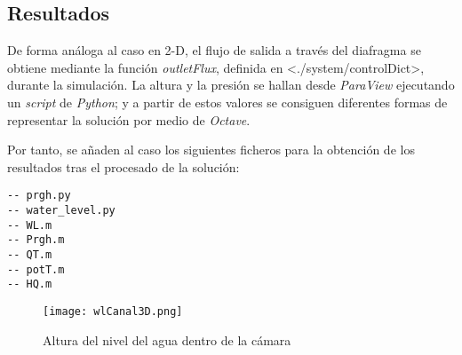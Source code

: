 \subsection{Resultados}\label{header-n176}

De forma análoga al caso en 2-D, el flujo de salida a través del
diafragma se obtiene mediante la función \emph{outletFlux}, definida en
\textless{}./system/controlDict\textgreater{}, durante la simulación. La
altura y la presión se hallan desde \emph{ParaView} ejecutando un
\emph{script} de \emph{Python}; y a partir de estos valores se consiguen
diferentes formas de representar la solución por medio de \emph{Octave}.

Por tanto, se añaden al caso los siguientes ficheros para la obtención
de los resultados tras el procesado de la solución:

\begin{verbatim}
-- prgh.py
-- water_level.py
-- WL.m
-- Prgh.m
-- QT.m
-- potT.m
-- HQ.m
\end{verbatim}

\begin{figure}
\centering
\texttt{[image: wlCanal3D.png]}
\caption{Altura del nivel del agua dentro de la cámara}
\label{fig:wlCanal3D}
\end{figure}

